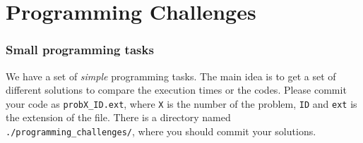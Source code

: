\section[Challenges]{Programming Challenges}
\begin{frame}
    \frametitle{Small programming tasks}    
    
We have a set of \emph{simple} programming tasks. The main idea is to get a set of different solutions to compare the execution times or the codes. Please commit your code as \texttt{probX\_ID.ext}, where \texttt{X} is the number of the problem, \texttt{ID} and \texttt{ext} is the extension of the file. There is a directory named \texttt{./programming\_challenges/}, where you should commit your solutions.

\end{frame}


\begin{frame}
    \frametitle{\large{}}
    \huge{\center{\color{RUBblau}{Thank you for your attention.}}}
\end{frame}


\note{}